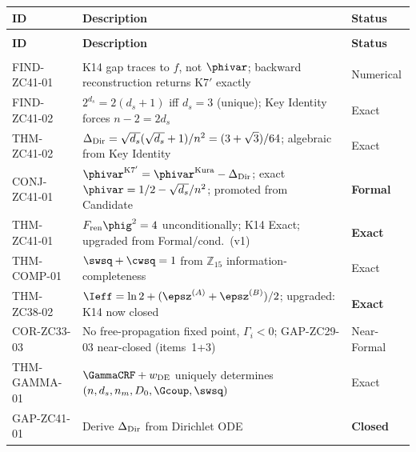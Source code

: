 \documentclass[12pt, a4paper]{article}
\begin{document}
\bigskip
{}
\begin{formalbox}[title={Atomic Registry --- ZC41 v2}]
{\small
\setlength{\LTpre}{4pt}
\setlength{\LTpost}{4pt}
\renewcommand{\arraystretch}{1.30}
\begin{longtable}{>{\raggedright\arraybackslash}p{3.3cm}
                  >{\raggedright\arraybackslash}p{6.7cm}
                  >{\centering\arraybackslash}p{2.2cm}}
\toprule
\textbf{ID} & \textbf{Description} & \textbf{Status} \\
\midrule
\endfirsthead
\multicolumn{3}{l}{\small\textit{(continued)}}\\[4pt]
\toprule
\textbf{ID} & \textbf{Description} & \textbf{Status} \\
\midrule
\endhead
\midrule
\multicolumn{3}{r}{\small\textit{(continues)}}\\
\endfoot
\bottomrule
\endlastfoot
FIND-ZC41-01 &
  K14 gap traces to $f$, not $\phivar$;
  backward reconstruction returns K7$'$ exactly &
  Numerical \\[4pt]
FIND-ZC41-02 &
  $2^{d_s}=2(d_s+1)$ iff $d_s=3$ (unique);
  Key Identity forces $n-2=2d_s$ &
  Exact \\[4pt]
THM-ZC41-02 &
  $\Delta_{\rm Dir}=\sqrt{d_s}(\sqrt{d_s}+1)/n^2
  =(3+\sqrt{3})/64$;
  algebraic from Key Identity &
  Exact \\[4pt]
CONJ-ZC41-01 &
  $\phivar^{\rm K7'} = \phivar^{\rm Kura}-\Delta_{\rm Dir}$;
  exact $\phivar=1/2-\sqrt{d_s}/n^2$;
  promoted from Candidate &
  \textbf{Formal} \\[4pt]
THM-ZC41-01 &
  $F_{\rm ren}\phig^2=4$ unconditionally;
  K14 Exact; upgraded from Formal/cond.\ (v1) &
  \textbf{Exact} \\[4pt]
THM-COMP-01 &
  $\swsq+\cwsq=1$ from $\mathbb{Z}_{15}$
  information-completeness &
  Exact \\[4pt]
THM-ZC38-02 &
  $\Ieff=\ln2+(\epsz^{(A)}+\epsz^{(B)})/2$;
  upgraded: K14 now closed &
  \textbf{Exact} \\[4pt]
COR-ZC33-03 &
  No free-propagation fixed point, $\Gamma_i<0$;
  GAP-ZC29-03 near-closed (items~1+3) &
  Near-Formal \\[4pt]
THM-GAMMA-01 &
  $\GammaCRF+w_{\rm DE}$ uniquely determines
  $(n,d_s,n_m,D_0,\Gcoup,\swsq)$ &
  Exact \\[4pt]
GAP-ZC41-01 &
  Derive $\Delta_{\rm Dir}$ from Dirichlet ODE &
  \textbf{Closed} \\
\end{longtable}
}
\end{formalbox}
\end{document}
